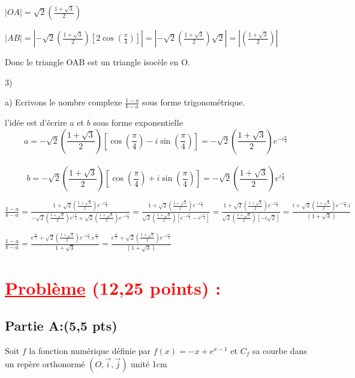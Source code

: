 \documentclass[12pt]{article}
\begin{document}
$|OA|=\sqrt{2}\left( \frac{1+\sqrt{3}}{2}\right)$

$|AB|=|-\sqrt{2}(\frac{1+\sqrt{3}}{2})\left[2\cos(\frac{\pi}{4})\right]|=|-\sqrt{2}(\frac{1+\sqrt{3}}{2})\sqrt{2}|=|(\frac{1+\sqrt{3}}{2})|$

Donc le triangle OAB est un triangle isocèle en O.

3) 

a) Ecrivons le nombre complexe $\frac{1-a}{b-a}$  sous forme trigonométrique.

l'idée est d'écrire $a$ et $b$ sous forme exponentielle \\

\[a=-\sqrt{2}\left( \frac{1+\sqrt{3}}{2}\right) \left[\cos(\frac{\pi}{4})-i\sin(\frac{\pi}{4})\right]=-\sqrt{2}\left( \frac{1+\sqrt{3}}{2}\right)e^{-i\frac{\pi}{4}}\]\\
\[b=-\sqrt{2}\left( \frac{1+\sqrt{3}}{2}\right) \left[\cos(\frac{\pi}{4})+i\sin(\frac{\pi}{4})\right]=-\sqrt{2}\left( \frac{1+\sqrt{3}}{2}\right)e^{i\frac{\pi}{4}}\]

$\frac{1-a}{b-a}=\frac{1+\sqrt{2}\left( \frac{1+\sqrt{3}}{2}\right)e^{-i\frac{\pi}{4}}}{-\sqrt{2}\left( \frac{1+\sqrt{3}}{2}\right)e^{i\frac{\pi}{4}}+\sqrt{2}\left( \frac{1+\sqrt{3}}{2}\right)e^{-i\frac{\pi}{4}}}=\frac{1+\sqrt{2}\left( \frac{1+\sqrt{3}}{2}\right)e^{-i\frac{\pi}{4}}}{\sqrt{2}\left( \frac{1+\sqrt{3}}{2}\right)\left[e^{-i\frac{\pi}{4}}-e^{i\frac{\pi}{4}}\right]}=\frac{1+\sqrt{2}\left( \frac{1+\sqrt{3}}{2}\right)e^{-i\frac{\pi}{4}}}{\sqrt{2}\left( \frac{1+\sqrt{3}}{2}\right)\left[-i\sqrt{2}\right]}=\frac{i+\sqrt{2}\left( \frac{1+\sqrt{3}}{2}\right)e^{-i\frac{\pi}{4}}.i}{\left(1+\sqrt{3}\right)}$

$\frac{1-a}{b-a}=\frac{e^{\frac{i\pi}{2}}+\sqrt{2}\left( \frac{1+\sqrt{3}}{2}\right)e^{-i\frac{\pi}{4}}.e^{\frac{i\pi}{2}}}{1+\sqrt{3}}=\frac{e^{\frac{i\pi}{2}}+\sqrt{2}\left( \frac{1+\sqrt{3}}{2}\right)e^{-i\frac{\pi}{2}}}{\left(1+\sqrt{3}\right)}$
\section*{\textcolor{red}{\underline{Problème} (12,25 points) :}}
\subsection*{Partie A:(5,5 pts)}
Soit $f$ la fonction numérique définie par $f(x)=-x+e^{x-1}$  et $C_{f}$ sa courbe dans un repère orthonormé $(O,\vec{i},\vec{j})$ unité 1cm
\end{document}
